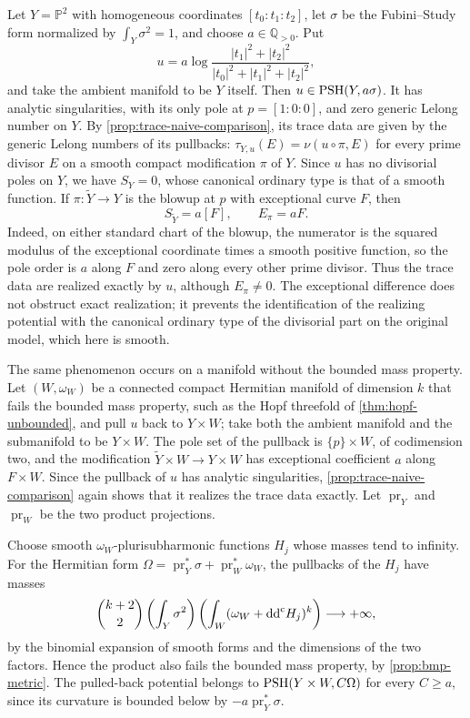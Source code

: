 \begin{example}\label{ex:exceptional-trace-with-exact-potential}
Let $Y=\mathbb P^2$ with homogeneous coordinates $[t_0:t_1:t_2]$, let $\sigma$ be the Fubini--Study form normalized by $\int_Y\sigma^2=1$, and choose $a\in\mathbb Q_{>0}$. Put
\[
 u=a\log\frac{|t_1|^2+|t_2|^2}
                   {|t_0|^2+|t_1|^2+|t_2|^2},
\]
and take the ambient manifold to be $Y$ itself. Then $u\in\mathrm{PSH}(Y,a\sigma)$. It has analytic singularities, with its only pole at $p=[1:0:0]$, and zero generic Lelong number on $Y$. By \cref{prop:trace-naive-comparison}, its trace data are given by the generic Lelong numbers of its pullbacks: $\tau_{Y,u}(E)=\nu(u\circ\pi,E)$ for every prime divisor $E$ on a smooth compact modification $\pi$ of $Y$. Since $u$ has no divisorial poles on $Y$, we have $S_Y=0$, whose canonical ordinary type is that of a smooth function. If $\pi\colon\widetilde Y\to Y$ is the blowup at $p$ with exceptional curve $F$, then
\[
 S_{\widetilde Y}=a[F],\qquad E_\pi=aF.
\]
Indeed, on either standard chart of the blowup, the numerator is the squared modulus of the exceptional coordinate times a smooth positive function, so the pole order is $a$ along $F$ and zero along every other prime divisor. Thus the trace data are realized exactly by $u$, although $E_\pi\neq0$. The exceptional difference does not obstruct exact realization; it prevents the identification of the realizing potential with the canonical ordinary type of the divisorial part on the original model, which here is smooth.

The same phenomenon occurs on a manifold without the bounded mass property. Let $(W,\omega_W)$ be a connected compact Hermitian manifold of dimension $k$ that fails the bounded mass property, such as the Hopf threefold of \cref{thm:hopf-unbounded}, and pull $u$ back to $Y\times W$; take both the ambient manifold and the submanifold to be $Y\times W$. The pole set of the pullback is $\{p\}\times W$, of codimension two, and the modification $\widetilde Y\times W\to Y\times W$ has exceptional coefficient $a$ along $F\times W$. Since the pullback of $u$ has analytic singularities, \cref{prop:trace-naive-comparison} again shows that it realizes the trace data exactly. Let $\operatorname{pr}_Y$ and $\operatorname{pr}_W$ be the two product projections.

Choose smooth $\omega_W$-plurisubharmonic functions $H_j$ whose masses tend to infinity. For the Hermitian form $\Omega=\operatorname{pr}_Y^*\sigma+\operatorname{pr}_W^*\omega_W$, the pullbacks of the $H_j$ have masses
\[
 \binom{k+2}{2}\left(\int_Y\sigma^2\right)
          \left(\int_W(\omega_W+\mathrm{dd}^{\mathrm{c}} H_j)^k\right)\longrightarrow+\infty,
\]
by the binomial expansion of smooth forms and the dimensions of the two factors. Hence the product also fails the bounded mass property, by \cref{prop:bmp-metric}. The pulled-back potential belongs to $\mathrm{PSH}(Y\times W,C\Omega)$ for every $C\geq a$, since its curvature is bounded below by $-a\operatorname{pr}_Y^*\sigma$.
\end{example}
